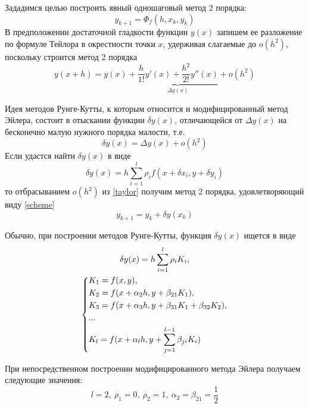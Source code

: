 \documentclass[a4paper, 12pt]{article}
\theoremstyle{mythm}
\begin{document}
	Зададимся целью построить явный одношаговый метод 2 порядка:
	\begin{equation} \label{scheme}
		y_{k+1}=\Phi_f(h,x_{k},y_{k})
	\end{equation}
	В предположении достаточной гладкости функции $y(x)$ запишем ее разложение по формуле Тейлора в окрестности точки $x$, удерживая слагаемые до $o(h^2)$, поскольку строится метод 2 порядка
	\begin{equation} \label{taylor}
		y(x+h)=y(x)+\underbrace{\dfrac{h}{1!}y'(x)+\dfrac{h^2}{2!}y''(x)}_{\Delta y(x)}+o(h^2)
	\end{equation} 

	Идея методов Рунге-Кутты, к которым относится и модифицированный метод Эйлера, состоит в отыскании функции $\delta y(x)$, отличающейся от $\Delta y(x)$ на бесконечно малую нужного порядка малости, т.е.
	\begin{equation}
		\delta y(x) = \Delta y(x) + o(h^2)
	\end{equation}
	Если удастся найти $\delta y(x)$ в виде
	\begin{equation}
		\delta y(x) = h\sum\limits_{i=1}^l \rho_if(x+\delta x_i, y + \delta y_i)
	\end{equation}
	то отбрасыванием $o(h^2)$ из \eqref{taylor} получим метод 2 порядка, удовлетворяющий виду \eqref{scheme}
	\begin{equation}
		y_{k+1} = y_{k} + \delta y(x_{k})
	\end{equation}
	
	Обычно, при построении методов Рунге-Кутты, функция $\delta y(x)$ ищется в виде
	\begin{equation}
		\begin{gathered}
			\delta y(x) = h\sum\limits_{i=1}^l\rho_iK_i,\\
			\begin{dcases}
				K_1 = f(x,y),\\
				K_2 = f(x + \alpha_2h, y + \beta_{21}K_1),\\
				K_3 = f(x + \alpha_3h, y + \beta_{31}K_1 + \beta_{32}K_2),\\
				...\\
				K_l = f(x + \alpha_lh, y + \sum\limits_{j=1}^{l-1}\beta_{ji}K_i)
			\end{dcases}
		\end{gathered}		
	\end{equation}

	При непосредственном построении модифицированного метода Эйлера получаем следующие значения:
	\begin{equation}
		l=2,\ \rho_1=0,\ \rho_2=1,\ \alpha_2=\beta_{21}=\dfrac{1}{2}
	\end{equation}
\end{document}
